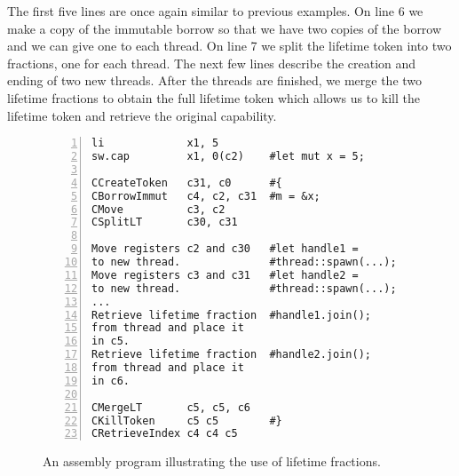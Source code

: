 The first five lines are once again similar to previous examples.
On line 6 we make a copy of the immutable borrow so that we have two copies of the borrow and we can give one to each thread.
On line 7 we split the lifetime token into two fractions, one for each thread.
The next few lines describe the creation and ending of two new threads.
After the threads are finished, we merge the two lifetime fractions to obtain the full lifetime token which allows us to kill the lifetime token and retrieve the original capability.

\begin{figure}[h]
\begin{lstlisting}[style=custASM, numbers = left ,xleftmargin=1.5em]
li             x1, 5
sw.cap         x1, 0(c2)    #let mut x = 5;

CCreateToken   c31, c0      #{
CBorrowImmut   c4, c2, c31  #m = &x;
CMove          c3, c2
CSplitLT       c30, c31

Move registers c2 and c30   #let handle1 =
to new thread.              #thread::spawn(...);
Move registers c3 and c31   #let handle2 =
to new thread.              #thread::spawn(...);
...
Retrieve lifetime fraction  #handle1.join();
from thread and place it
in c5.
Retrieve lifetime fraction  #handle2.join();
from thread and place it
in c6.

CMergeLT       c5, c5, c6
CKillToken     c5 c5        #}
CRetrieveIndex c4 c4 c5
\end{lstlisting}
\caption{An assembly program illustrating the use of lifetime fractions.}
\label{fig:asmthreadexample}
\end{figure}
